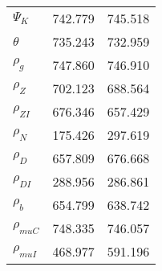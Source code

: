 \begin{center}
\begin{longtable}{lcc}
$ {\Psi_{K}}           $	 & 	     742.779	 & 	     745.518 \\ 
$ {\theta}             $	 & 	     735.243	 & 	     732.959 \\ 
$ {\rho_g}             $	 & 	     747.860	 & 	     746.910 \\ 
$ {\rho_Z}             $	 & 	     702.123	 & 	     688.564 \\ 
$ {\rho_{ZI}}          $	 & 	     676.346	 & 	     657.429 \\ 
$ {\rho_N}             $	 & 	     175.426	 & 	     297.619 \\ 
$ {\rho_D}             $	 & 	     657.809	 & 	     676.668 \\ 
$ {\rho_{DI}}          $	 & 	     288.956	 & 	     286.861 \\ 
$ {\rho_b}             $	 & 	     654.799	 & 	     638.742 \\ 
$ {\rho_{muC}}         $	 & 	     748.335	 & 	     746.057 \\ 
$ {\rho_{muI}}         $	 & 	     468.977	 & 	     591.196 \\ 
\end{longtable}
 \end{center}
